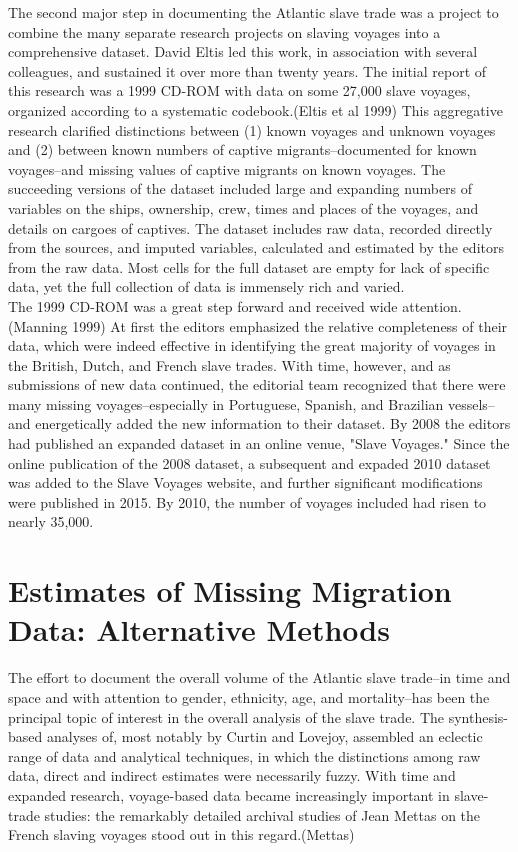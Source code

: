 \documentclass[preprint,12pt]{elsarticle}
\begin{document}
The second major step in documenting the Atlantic slave trade was a project to combine the many separate research projects on slaving voyages into a comprehensive dataset. David Eltis led this work, in association with several colleagues, and sustained it over more than twenty years. The initial report of this research was a 1999 CD-ROM with data on some 27,000 slave voyages, organized according to a systematic codebook.(Eltis et al 1999)  This aggregative research clarified distinctions between (1) known voyages and unknown voyages and (2) between known numbers of captive migrants--documented for known voyages--and missing values of captive migrants on known voyages. The succeeding versions of the dataset included large and expanding numbers of variables on the ships, ownership, crew, times and places of the voyages, and details on cargoes of captives. The dataset includes raw data, recorded directly from the sources, and imputed variables, calculated and estimated by the editors from the raw data. Most cells for the full dataset are empty for lack of specific data, yet the full collection of data is immensely rich and varied.\\

The 1999 CD-ROM was a great step forward and received wide attention.(Manning 1999) At first the editors emphasized the relative completeness of their data, which were indeed effective in identifying the great majority of voyages in the British, Dutch, and French slave trades. With time, however, and as submissions of new data continued, the editorial team recognized that there were many missing voyages--especially in Portuguese, Spanish, and Brazilian vessels--and energetically added the new information to their dataset. By 2008 the editors had published an expanded dataset in an online venue, "Slave Voyages." Since the online publication of the 2008 dataset, a subsequent and expaded 2010 dataset was added to the Slave Voyages website, and further significant modifications were published in 2015. By 2010, the number of voyages included had risen to nearly 35,000.\\

\section{Estimates of Missing Migration Data: Alternative Methods}
\label{S:3}
The effort to document the overall volume of the Atlantic slave trade--in time and space and with attention to gender, ethnicity, age, and mortality--has been the principal topic of interest in the overall analysis of the slave trade. The synthesis-based analyses of, most notably by Curtin and Lovejoy, assembled an eclectic range of data and analytical techniques, in which the distinctions among raw data, direct and indirect estimates were necessarily fuzzy. With time and expanded research, voyage-based data became increasingly important in slave-trade studies: the remarkably detailed archival studies of Jean Mettas on the French slaving voyages stood out in this regard.(Mettas) \\
\end{document}
